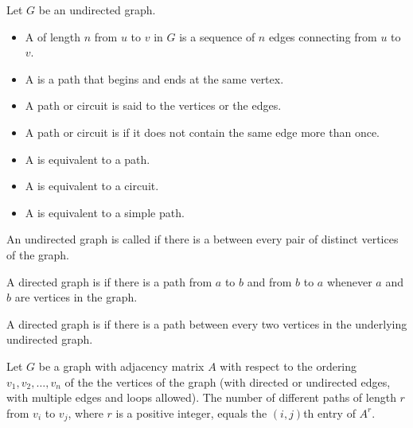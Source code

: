         \par Let $G$ be an undirected graph.
        \begin{itemize}
            \item A  of length $n$ from $u$ to $v$ in $G$ is a sequence of $n$ edges
                connecting from $u$ to $v$.
            \item A  is a path that begins and ends at the same vertex.
            \item A path or circuit is said to  the vertices or 
                the edges.
            \item A path or circuit is  if it does not contain the same edge more
                than once.
            \item A  is equivalent to a path.
            \item A  is equivalent to a circuit.
            \item A  is equivalent to a simple path.
        \end{itemize}


        

        \par An undirected graph is called  if there is a  between
            every pair of distinct vertices of the graph.

        \par A directed graph is  if there is a path from $a$
            to $b$ and from $b$ to $a$ whenever $a$ and $b$ are vertices in the graph.
         \par A directed graph is  if there is a path between
            every two vertices in the underlying undirected graph.

        \par Let $G$ be a graph with adjacency matrix $A$ with respect to the ordering
        $v_{1}, v_{2}, \ldots, v_{n}$ of the the vertices of the graph (with directed or
        undirected edges, with multiple edges and loops allowed). The number of different paths
        of length $r$ from $v_{i}$ to $v_{j}$, where $r$ is a positive integer, equals the
        $(i, j)$th entry of $A^{r}$.

